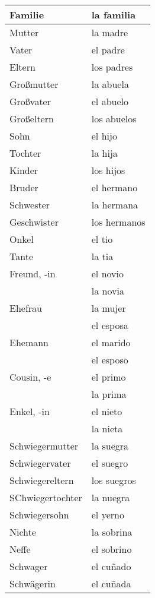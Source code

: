 \documentclass{spanish_summary}
\begin{document}
\begin{longtable}{p{} | p{}} 
\textbf{Familie}     & \textbf{la familia}                                       \\ \hline
\hline
\endhead %
Mutter &  la madre \\
Vater & el padre \\
Eltern & los padres \\
Großmutter & la abuela \\
Großvater & el abuelo \\
Großeltern & los abuelos \\
Sohn & el hijo \\
Tochter & la hija \\
Kinder & los hijos \\
Bruder & el hermano \\
Schwester & la hermana \\
Geschwister & los hermanos \\
Onkel & el tio \\
Tante & la tia \\
Freund, -in & el novio \\
            & la novia \\
Ehefrau & la mujer \\
        & el esposa \\
Ehemann & el marido \\
        & el esposo \\
Cousin, -e & el primo \\
           & la prima \\
Enkel, -in & el nieto \\
           & la nieta \\
Schwiegermutter & la suegra \\
Schwiegervater & el suegro \\
Schwiegereltern & los suegros \\
SChwiegertochter & la nuegra \\
Schwiegersohn & el yerno \\
Nichte & la sobrina \\
Neffe & el sobrino \\
Schwager & el cu\~{n}ado\\
Schwägerin & el cu\~{n}ada

\end{longtable}
\end{document}
